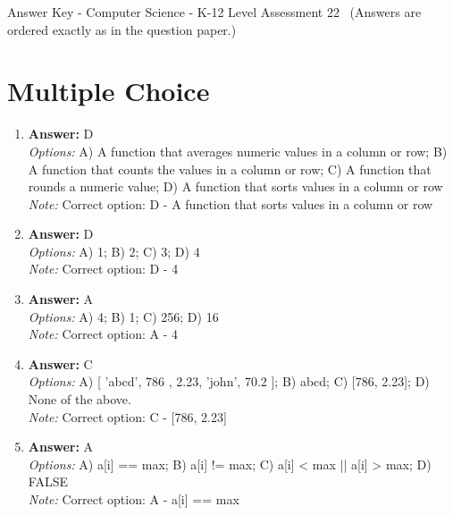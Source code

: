 \documentclass[12pt]{article}
\begin{document}
\begin{center}
Answer Key - Computer Science - K-12 Level Assessment 22 \
\small (Answers are ordered exactly as in the question paper.)
\end{center}

\section*{Multiple Choice}
\begin{enumerate}[label=\arabic*.]
\item \textbf{Answer:} D
\\ \textit{Options:} A) A function that averages numeric values in a column or row; B) A function that counts the values in a column or row; C) A function that rounds a numeric value; D) A function that sorts values in a column or row
\\ \textit{Note:} Correct option: D - A function that sorts values in a column or row
\item \textbf{Answer:} D
\\ \textit{Options:} A) 1; B) 2; C) 3; D) 4
\\ \textit{Note:} Correct option: D - 4
\item \textbf{Answer:} A
\\ \textit{Options:} A) 4; B) 1; C) 256; D) 16
\\ \textit{Note:} Correct option: A - 4
\item \textbf{Answer:} C
\\ \textit{Options:} A) [ 'abcd', 786 , 2.23, 'john', 70.2 ]; B) abcd; C) [786, 2.23]; D) None of the above.
\\ \textit{Note:} Correct option: C - [786, 2.23]
\item \textbf{Answer:} A
\\ \textit{Options:} A) a[i] == max; B) a[i] != max; C) a[i] \textless{} max || a[i] \textgreater{} max; D) FALSE
\\ \textit{Note:} Correct option: A - a[i] == max
\end{enumerate}
\end{document}
